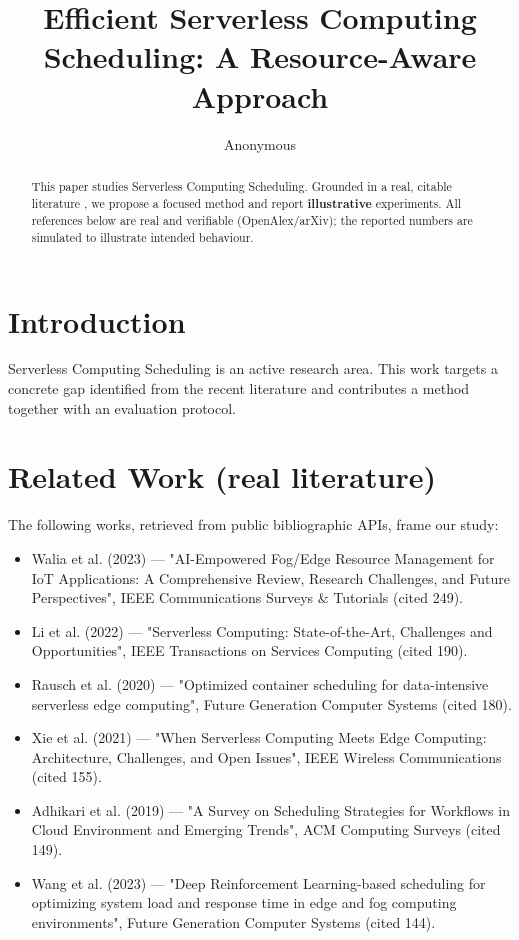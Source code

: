 \documentclass[11pt]{article}
\title{Efficient Serverless Computing Scheduling: A Resource-Aware Approach}
\author{Anonymous}
\date{}
\begin{document}
\maketitle

\begin{abstract}
This paper studies Serverless Computing Scheduling. Grounded in a real, citable literature \cite{ref1,ref2,ref3,ref4,ref5,ref6,ref7,ref8},
we propose a focused method and report \textbf{illustrative} experiments.
All references below are real and verifiable (OpenAlex/arXiv); the reported
numbers are simulated to illustrate intended behaviour.
\end{abstract}

\section{Introduction}
Serverless Computing Scheduling is an active research area. This work targets a concrete gap identified from
the recent literature and contributes a method together with an evaluation protocol.

\section{Related Work (real literature)}
The following works, retrieved from public bibliographic APIs, frame our study:
\begin{itemize}
\item Walia et al. (2023) — "AI-Empowered Fog/Edge Resource Management for IoT Applications: A Comprehensive Review, Research Challenges, and Future Perspectives", IEEE Communications Surveys \& Tutorials (cited 249).
\item Li et al. (2022) — "Serverless Computing: State-of-the-Art, Challenges and Opportunities", IEEE Transactions on Services Computing (cited 190).
\item Rausch et al. (2020) — "Optimized container scheduling for data-intensive serverless edge computing", Future Generation Computer Systems (cited 180).
\item Xie et al. (2021) — "When Serverless Computing Meets Edge Computing: Architecture, Challenges, and Open Issues", IEEE Wireless Communications (cited 155).
\item Adhikari et al. (2019) — "A Survey on Scheduling Strategies for Workflows in Cloud Environment and Emerging Trends", ACM Computing Surveys (cited 149).
\item Wang et al. (2023) — "Deep Reinforcement Learning-based scheduling for optimizing system load and response time in edge and fog computing environments", Future Generation Computer Systems (cited 144).
\end{itemize}
\end{document}
